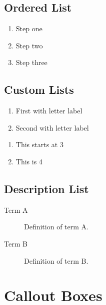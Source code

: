 \documentclass[a4paper,12pt]{article}
\begin{document}
\subsection{Ordered List}

\begin{enumerate}
    \item Step one
    \item Step two
    \item Step three
\end{enumerate}

\subsection{Custom Lists}

\begin{enumerate}[label=(\alph*)]
    \item First with letter label
    \item Second with letter label
\end{enumerate}

\begin{enumerate}[start=3]
    \item This starts at 3
    \item This is 4
\end{enumerate}

\subsection{Description List}

\begin{description}
    \item[Term A] Definition of term A.
    \item[Term B] Definition of term B.
\end{description}

\section{Callout Boxes}

\end{document}
